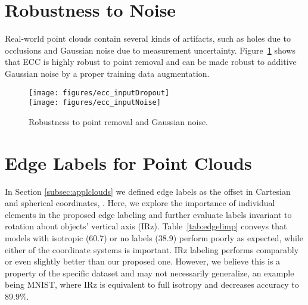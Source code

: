 \documentclass[10pt,twocolumn,letterpaper]{article}
\begin{document}
\section{Robustness to Noise} \label{sec:pcnoise}

Real-world point clouds contain several kinds of artifacts, such as holes due to occlusions and Gaussian noise due to measurement uncertainty. Figure~\ref{fig:robutness} shows that ECC is highly robust to point removal and can be made robust to additive Gaussian noise by a proper training data augmentation.

\begin{figure}[bt]
\centering
\texttt{[image: figures/ecc\_inputDropout]} \\
\texttt{[image: figures/ecc\_inputNoise]}
\caption{\label{fig:robutness}
Robustness to point removal and Gaussian noise.}
\end{figure}



\section{Edge Labels for Point Clouds} \label{sec:pclabels}

In Section \ref{subsec:applclouds} we defined edge labels  as the offset  in Cartesian and spherical coordinates, . Here, we explore the importance of individual elements in the proposed edge labeling and further evaluate labels invariant to rotation about objects' vertical axis  (IRz). Table~\ref{tab:edgelimp} conveys that models with isotropic (60.7) or no labels (38.9) perform poorly as expected, while either of the coordinate systems is important. IRz labeling performs comparably or even slightly better than our proposed one. However, we believe this is a property of the specific dataset and may not necessarily generalize, an example being MNIST, where IRz is equivalent to full isotropy and decreases accuracy to 89.9\%.


\begin{table}[bt]
\centering
{}
\vspace{1ex}
\caption{\label{tab:edgelimp}
ECC on Sydney with varied edge label definition.}
\end{table}
\end{document}
